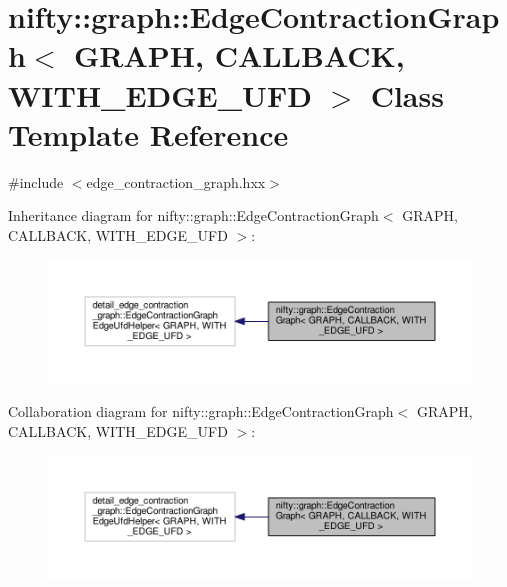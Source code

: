 \hypertarget{classnifty_1_1graph_1_1EdgeContractionGraph}{}\section{nifty\+:\+:graph\+:\+:Edge\+Contraction\+Graph$<$ G\+R\+A\+P\+H, C\+A\+L\+L\+B\+A\+C\+K, W\+I\+T\+H\+\_\+\+E\+D\+G\+E\+\_\+\+U\+F\+D $>$ Class Template Reference}
\label{classnifty_1_1graph_1_1EdgeContractionGraph}


{\ttfamily \#include $<$edge\+\_\+contraction\+\_\+graph.\+hxx$>$}



Inheritance diagram for nifty\+:\+:graph\+:\+:Edge\+Contraction\+Graph$<$ G\+R\+A\+P\+H, C\+A\+L\+L\+B\+A\+C\+K, W\+I\+T\+H\+\_\+\+E\+D\+G\+E\+\_\+\+U\+F\+D $>$\+:\nopagebreak
\begin{figure}[H]
\begin{center}
\leavevmode
\includegraphics[width=350pt]{classnifty_1_1graph_1_1EdgeContractionGraph__inherit__graph}
\end{center}
\end{figure}


Collaboration diagram for nifty\+:\+:graph\+:\+:Edge\+Contraction\+Graph$<$ G\+R\+A\+P\+H, C\+A\+L\+L\+B\+A\+C\+K, W\+I\+T\+H\+\_\+\+E\+D\+G\+E\+\_\+\+U\+F\+D $>$\+:\nopagebreak
\begin{figure}[H]
\begin{center}
\leavevmode
\includegraphics[width=350pt]{classnifty_1_1graph_1_1EdgeContractionGraph__coll__graph}
\end{center}
\end{figure}
